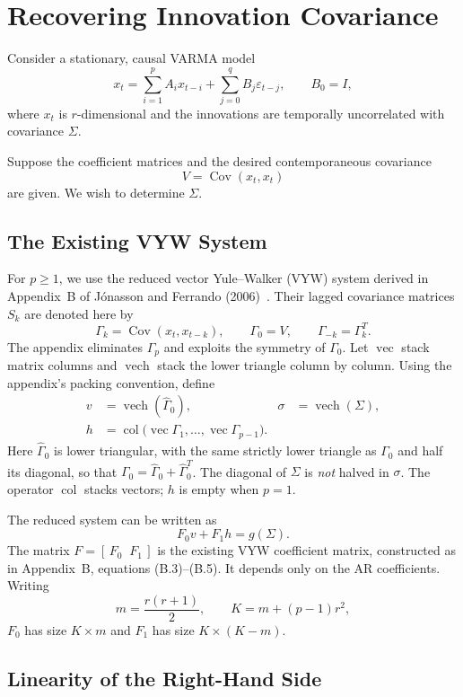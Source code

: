 \documentclass[11pt,a4paper]{article}
\begin{document}
\section*{Recovering Innovation Covariance}

Consider a stationary, causal VARMA model
$$
x_t=\sum_{i=1}^{p}A_i x_{t-i}
    +\sum_{j=0}^{q}B_j\varepsilon_{t-j},
\qquad B_0=I,
$$
where $x_t$ is $r$-dimensional and the innovations are temporally uncorrelated
with covariance $\Sigma$.

Suppose the coefficient matrices and the desired contemporaneous covariance
$$
V=\operatorname{Cov}(x_t,x_t)
$$
are given. We wish to determine $\Sigma$.

\subsection*{The Existing VYW System}

For $p\geq1$, we use the reduced vector Yule--Walker (VYW) system derived in
Appendix~B of J\'onasson and Ferrando (2006)~\cite{jf2006}. Their lagged covariance
matrices $S_k$ are denoted here by
$$
\Gamma_k=\operatorname{Cov}(x_t,x_{t-k}),
\qquad \Gamma_0=V,\qquad \Gamma_{-k}=\Gamma_k^T.
$$
The appendix eliminates $\Gamma_p$ and exploits the symmetry of $\Gamma_0$.
Let $\operatorname{vec}$ stack matrix columns and $\operatorname{vech}$ stack the
lower triangle column by column. Using the appendix's packing convention, define
$$
\begin{aligned}
v&=\operatorname{vech}(\widehat{\Gamma}_0),&
\sigma&=\operatorname{vech}(\Sigma),\\
h&=\operatorname{col}\bigl(
  \operatorname{vec}\Gamma_1,\ldots,\operatorname{vec}\Gamma_{p-1}\bigr).
\end{aligned}
$$
Here $\widehat{\Gamma}_0$ is lower triangular, with the same strictly lower
triangle as $\Gamma_0$ and half its diagonal, so that
$\Gamma_0=\widehat{\Gamma}_0+\widehat{\Gamma}_0^T$. The diagonal of $\Sigma$ is
\emph{not} halved in $\sigma$. The operator $\operatorname{col}$ stacks vectors;
$h$ is empty when $p=1$.

The reduced system can be written as
$$
F_0v+F_1h=g(\Sigma).
$$
The matrix $F=[\,F_0\;\;F_1\,]$ is the existing VYW coefficient matrix, constructed
as in Appendix~B, equations (B.3)--(B.5). It depends only on the AR coefficients.
Writing
$$
m=\frac{r(r+1)}{2},\qquad K=m+(p-1)r^2,
$$
$F_0$ has size $K\times m$ and $F_1$ has size $K\times(K-m)$.

\subsection*{Linearity of the Right-Hand Side}
\end{document}

